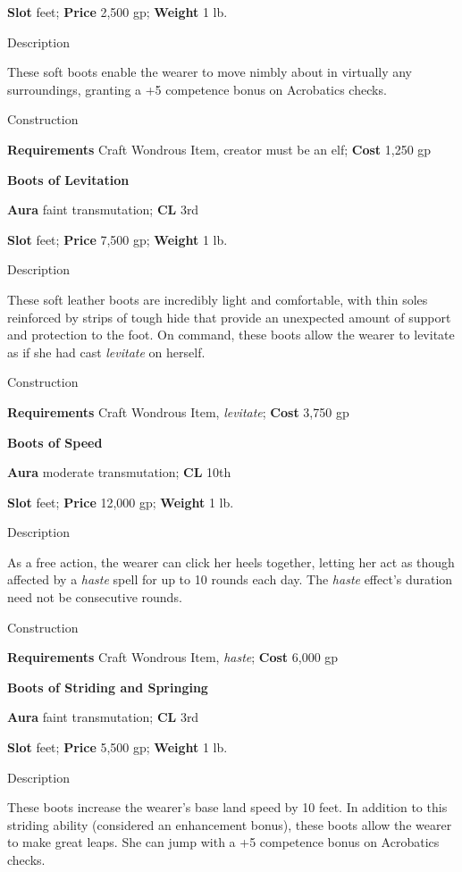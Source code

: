 \textbf{Slot} feet; \textbf{Price} 2,500 gp; \textbf{Weight} 1 lb.
				
Description
				
These soft boots enable the wearer to move nimbly about in virtually any surroundings, granting a +5 competence bonus on Acrobatics checks. 
				
Construction
				
\textbf{Requirements} Craft Wondrous Item, creator must be an elf; \textbf{Cost }1,250 gp
				
\textbf{Boots of Levitation}
				
\textbf{Aura} faint transmutation;\textbf{ CL }3rd
				
\textbf{Slot} feet; \textbf{Price} 7,500 gp; \textbf{Weight} 1 lb.
				
Description
				
These soft leather boots are incredibly light and comfortable, with thin soles reinforced by strips of tough hide that provide an unexpected amount of support and protection to the foot. On command, these boots allow the wearer to levitate as if she had cast \textit{levitate }on herself. 
				
Construction
				
\textbf{Requirements} Craft Wondrous Item, \textit{levitate}; \textbf{Cost }3,750 gp
				
\textbf{Boots of Speed}
				
\textbf{Aura} moderate transmutation;\textbf{ CL }10th
				
\textbf{Slot} feet; \textbf{Price} 12,000 gp; \textbf{Weight} 1 lb.
				
Description
				
As a free action, the wearer can click her heels together, letting her act as though affected by a \textit{haste }spell for up to 10 rounds each day. The \textit{haste }effect's duration need not be consecutive rounds. 
				
Construction
				
\textbf{Requirements} Craft Wondrous Item, \textit{haste}; \textbf{Cost }6,000 gp
				
\textbf{Boots of Striding and Springing}
				
\textbf{Aura} faint transmutation;\textbf{ CL }3rd
				
\textbf{Slot} feet; \textbf{Price} 5,500 gp; \textbf{Weight} 1 lb.
				
Description
				
These boots increase the wearer's base land speed by 10 feet. In addition to this striding ability (considered an enhancement bonus), these boots allow the wearer to make great leaps. She can jump with a +5 competence bonus on Acrobatics checks. 
				

